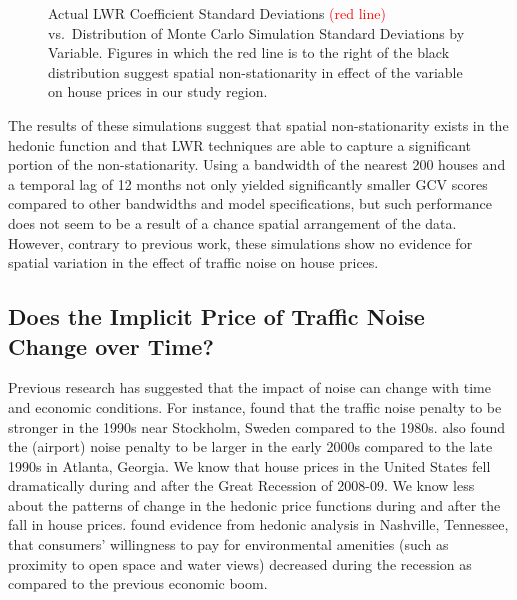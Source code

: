 \documentclass{article}\usepackage[]{graphicx}\usepackage[]{color}
\begin{document}
\begin{figure}
 \caption{Actual LWR Coefficient Standard Deviations \textcolor{red}{(red line)} vs.\ Distribution of Monte Carlo Simulation Standard Deviations by Variable. Figures in which the red line is to the right of the black distribution suggest spatial non-stationarity in effect of the variable on house prices in our study region.}\label{fig:MCsds}
\end{figure}

The results of these simulations suggest that spatial non-stationarity exists in the hedonic function and that LWR techniques are able to capture a significant portion of the non-stationarity. Using a bandwidth of the nearest 200 houses and a temporal lag of 12 months not only yielded significantly smaller GCV scores compared to other bandwidths and model specifications, but such performance does not seem to be a result of a chance spatial arrangement of the data. However, contrary to previous work, these simulations show no evidence for spatial variation in the effect of traffic noise on house prices.

\subsection{Does the Implicit Price of Traffic Noise Change over Time?}

Previous research has suggested that the impact of noise can change with time and economic conditions. For instance, \citet{Wilhelmsson2000} found that the traffic noise penalty to be stronger in the 1990s near Stockholm, Sweden compared to the 1980s. \citet{Cohen2009} also found the (airport) noise penalty to be larger in the early 2000s compared to the late 1990s in Atlanta, Georgia. We know that house prices in the United States fell dramatically during and after the Great Recession of 2008-09. We know less about the patterns of change in the hedonic price functions during and after the fall in house prices. \citet{Cho2011b} found evidence from hedonic analysis in Nashville, Tennessee,  that consumers' willingness to pay for environmental amenities (such as proximity to open space and water views) decreased during the recession as compared to the previous economic boom. 
\end{document}
